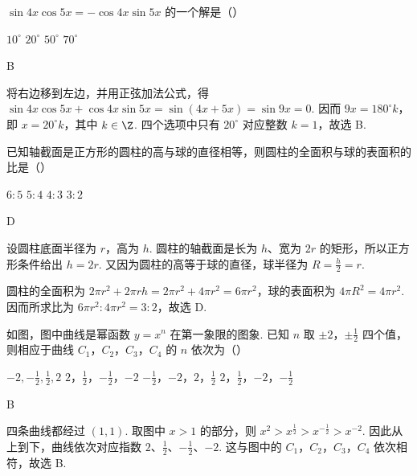 \begin{problem}
\(\sin 4x\cos 5x=-\cos 4x\sin 5x\) 的一个解是（\quad）

\choices
    {\(10^{\circ}\)}
    {\(20^{\circ}\)}
    {\(50^{\circ}\)}
    {\(70^{\circ}\)}

\begin{answer}
B
\end{answer}

\begin{solution}
将右边移到左边，并用正弦加法公式，得
\(\sin4x\cos5x+\cos4x\sin5x=\sin(4x+5x)=\sin9x=0\). 因而 \(9x=180^{\circ}k\)，即 \(x=20^{\circ}k\)，其中 \(k\in\Z\). 四个选项中只有 \(20^{\circ}\) 对应整数 \(k=1\)，故选 B.
\end{solution}
\end{problem}

\begin{problem}
已知轴截面是正方形的圆柱的高与球的直径相等，则圆柱的全面积与球的表面积的比是（\quad）

\choices
    {\(6:5\)}
    {\(5:4\)}
    {\(4:3\)}
    {\(3:2\)}

\begin{answer}
D
\end{answer}

\begin{solution}
设圆柱底面半径为 \(r\)，高为 \(h\). 圆柱的轴截面是长为 \(h\)、宽为 \(2r\) 的矩形，所以正方形条件给出 \(h=2r\). 又因为圆柱的高等于球的直径，球半径为 \(R=\frac h2=r\).

圆柱的全面积为 \(2\pi r^2+2\pi rh=2\pi r^2+4\pi r^2=6\pi r^2\)，球的表面积为 \(4\pi R^2=4\pi r^2\). 因而所求比为 \(6\pi r^2:4\pi r^2=3:2\)，故选 D.
\end{solution}
\end{problem}

\begin{problem}
如图，图中曲线是幂函数 \(y=x^n\) 在第一象限的图象. 已知 \(n\) 取 \(\pm 2\)，\(\pm \frac{1}{2}\) 四个值，则相应于曲线 \(C_1\)，\(C_2\)，\(C_3\)，\(C_4\) 的 \(n\) 依次为（\quad）


\choices
    {\(-2, -\frac{1}{2}, \frac{1}{2}, 2\)}
    {\(2\)，\(\frac{1}{2}\)，\(-\frac{1}{2}\)，\(-2\)}
    {\(-\frac{1}{2}\)，\(-2\)，\(2\)，\(\frac{1}{2}\)}
    {\(2\)，\(\frac{1}{2}\)，\(-2\)，\(-\frac{1}{2}\)}

\begin{answer}
B
\end{answer}

\begin{solution}
四条曲线都经过 \((1,1)\). 取图中 \(x>1\) 的部分，则
\(x^2>x^{\frac{1}{2}}>x^{-\frac{1}{2}}>x^{-2}\). 因此从上到下，曲线依次对应指数 \(2\)、\(\frac12\)、\(-\frac12\)、\(-2\). 这与图中的 \(C_1\)，\(C_2\)，\(C_3\)，\(C_4\) 依次相符，故选 B.
\end{solution}
\end{problem}

